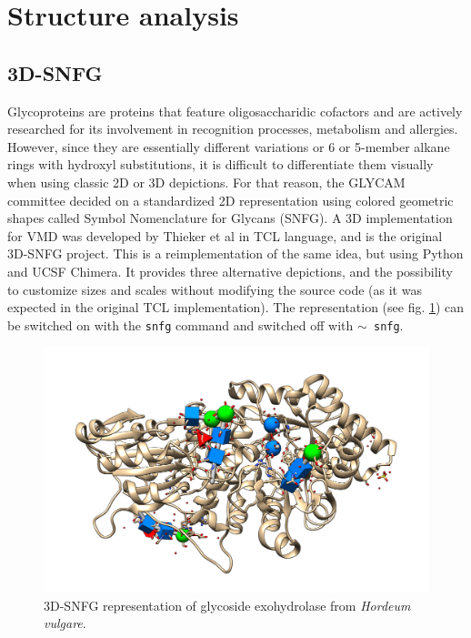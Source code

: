 \section{Structure analysis}

\subsection{3D-SNFG}
Glycoproteins are proteins that feature oligosaccharidic cofactors and are actively researched for its involvement in recognition processes, metabolism and allergies. However, since they are essentially different variations or 6 or 5-member alkane rings with hydroxyl  substitutions, it is difficult to differentiate them visually when using classic 2D or 3D depictions. For that reason, the GLYCAM committee decided on a standardized 2D representation using colored geometric shapes called Symbol Nomenclature for Glycans (SNFG).\cite{snfg} A 3D implementation for VMD was developed by Thieker et al\cite{3dsnfg} in TCL language, and is the original 3D-SNFG project. This is a reimplementation of the same idea, but using Python and UCSF Chimera. It provides three alternative depictions, and the possibility to customize sizes and scales without modifying the source code (as it was expected in the original TCL implementation). The representation (see fig. \ref{fig:tangram-snfg}) can be switched on with the \texttt{snfg} command and switched off with \texttt{$ \sim $ snfg}.

\begin{figure}[t]
	\begin{Center}
		\includegraphics[width=\textwidth]{./figures/05/tangram_snfg.png}
	\end{Center}
	\cprotect\caption[Tangram 3D-SNFG]{3D-SNFG representation of glycoside exohydrolase from \textit{Hordeum vulgare}.\cite{3wlh}}
	\label{fig:tangram-snfg}
\end{figure}

